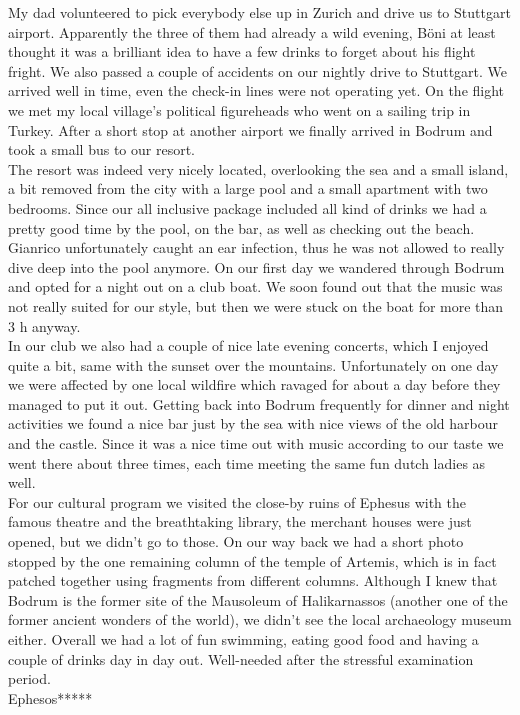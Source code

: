 My dad volunteered to pick everybody else up in Zurich and drive us to Stuttgart airport. Apparently the three of them had already a wild evening, B\"oni at least thought it was a brilliant idea to have a few drinks to forget about his flight fright. We also passed a couple of accidents on our nightly drive to Stuttgart. We arrived well in time, even the check-in lines were not operating yet. On the flight we met my local village's political figureheads who went on a sailing trip in Turkey. After a short stop at another airport we finally arrived in Bodrum and took a small bus to our resort.\\
The resort was indeed very nicely located, overlooking the sea and a small island, a bit removed from the city with a large pool and a small apartment with two bedrooms. Since our all inclusive package included all kind of drinks we had a pretty good time by the pool, on the bar, as well as checking out the beach. Gianrico unfortunately caught an ear infection, thus he was not allowed to really dive deep into the pool anymore. On our first day we wandered through Bodrum and opted for a night out on a club boat. We soon found out that the music was not really suited for our style, but then we were stuck on the boat for more than 3 h anyway.\\
 In our club we also had a couple of nice late evening concerts, which I enjoyed quite a bit, same with the sunset over the mountains. Unfortunately on one day we were affected by one local wildfire which ravaged for about a day before they managed to put it out. Getting back into Bodrum frequently for dinner and night activities we found a nice bar just by the sea with nice views of the old harbour and the castle. Since it was a nice time out with music according to our taste we went there about three times, each time meeting the same fun dutch ladies as well.\\
  For our cultural program we visited the close-by ruins of Ephesus with the famous theatre and the breathtaking library, the merchant houses were just opened, but we didn't go to those. On our way back we had a short photo stopped by the one remaining column of the temple of Artemis, which is in fact patched together using fragments from different columns. Although I knew that Bodrum is the former site of the Mausoleum of Halikarnassos (another one of the former ancient wonders of the world), we didn't see the local archaeology museum either. Overall we had a lot of fun swimming, eating good food and having a couple of drinks day in day out. Well-needed after the stressful examination period.\\

Ephesos*****\\